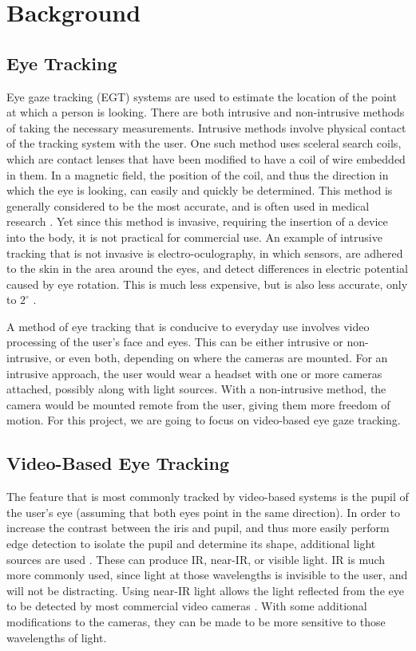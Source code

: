 \documentclass[12pt,conference,onecolumn]{IEEEtran}
\begin{document}
\section{Background} \label{sec:background}
\subsection{Eye Tracking}
Eye gaze tracking (EGT) systems are used to estimate the location of the point at which a person is looking. There are both intrusive and non-intrusive methods of taking the necessary measurements. Intrusive methods involve physical contact of the tracking system with the user. One such method uses sceleral search coils, which are contact lenses that have been modified to have a coil of wire embedded in them. In a magnetic field, the position of the coil, and thus the direction in which the eye is looking, can easily and quickly be determined. This method is generally considered to be the most accurate, and is often used in medical research \cite{chennamma}. Yet since this method is invasive, requiring the insertion of a device into the body, it is not practical for commercial use. An example of intrusive tracking that is not invasive is electro-oculography, in which sensors, are adhered to the skin in the area around the eyes, and detect differences in electric potential caused by eye rotation. This is much less expensive, but is also less accurate, only to $2^{\circ}$ \cite{morimoto}.

A method of eye tracking that is conducive to everyday use involves video processing of the user's face and eyes. This can be either intrusive or non-intrusive, or even both, depending on where the cameras are mounted. For an intrusive approach, the user would wear a headset with one or more cameras attached, possibly along with light sources. With a non-intrusive method, the camera would be mounted remote from the user, giving them more freedom of motion. For this project, we are going to focus on video-based eye gaze tracking.

\subsection{Video-Based Eye Tracking}
The feature that is most commonly tracked by video-based systems is the pupil of the user's eye (assuming that both eyes point in the same direction). In order to increase the contrast between the iris and pupil, and thus more easily perform edge detection to isolate the pupil and determine its shape, additional light sources are used . These can produce IR, near-IR, or visible light. IR is much more commonly used, since light at those wavelengths is invisible to the user, and will not be distracting. Using near-IR light allows the light reflected from the eye to be detected by most commercial video cameras \cite{morimoto}. With some additional modifications to the cameras, they can be made to be more sensitive to those wavelengths of light. 
\end{document}
